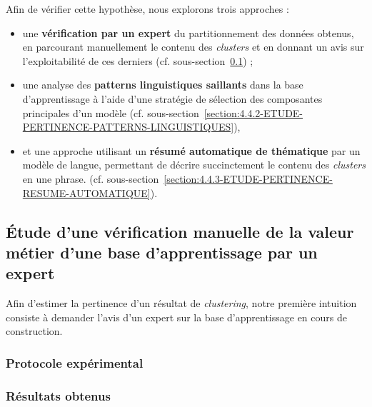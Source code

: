 	Afin de vérifier cette hypothèse, nous explorons trois approches :
	\begin{itemize}
		\item une \textbf{vérification par un expert} du partitionnement des données obtenus, en parcourant manuellement le contenu des \textit{clusters} et en donnant un avis sur l'exploitabilité de ces derniers (cf. sous-section~\ref{section:4.4.1-ETUDE-PERTINENCE-VERIFICATION-MANUELLE}) ;
		\item une analyse des \textbf{patterns linguistiques saillants} dans la base d'apprentissage à l'aide d'une stratégie de sélection des composantes principales d'un modèle (cf. sous-section~\ref{section:4.4.2-ETUDE-PERTINENCE-PATTERNS-LINGUISTIQUES}),
		\item et une approche utilisant un \textbf{résumé automatique de thématique} par un modèle de langue, permettant de décrire succinctement le contenu des \textit{clusters} en une phrase. (cf. sous-section~\ref{section:4.4.3-ETUDE-PERTINENCE-RESUME-AUTOMATIQUE}).
	\end{itemize}
	
	
	\subsection{Étude d'une vérification manuelle de la valeur métier d'une base d'apprentissage par un expert}
	\label{section:4.4.1-ETUDE-PERTINENCE-VERIFICATION-MANUELLE}
		
		Afin d'estimer la pertinence d'un résultat de \textit{clustering}, notre première intuition consiste à demander l'avis d'un expert sur la base d'apprentissage en cours de construction.
	
		\subsubsection{Protocole expérimental}

		\subsubsection{Résultats obtenus}
		
